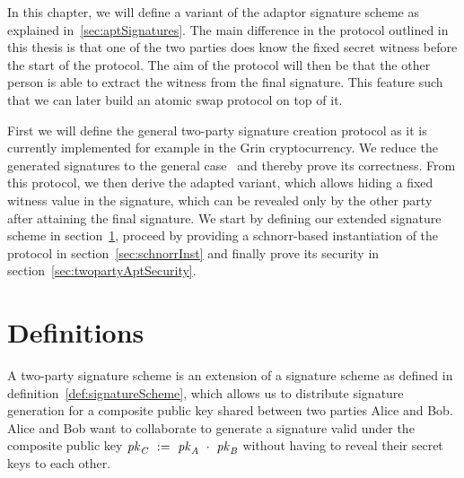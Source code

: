 In this chapter, we will define a variant of the adaptor signature scheme as explained in~\ref{sec:aptSignatures}. The main difference in the protocol outlined in this thesis is that one of the two parties does know the fixed secret witness before the start of the protocol. The aim of the protocol will then be that the other person is able to extract the witness from the final signature. This feature such that we can later build an atomic swap protocol on top of it.

First we will define the general two-party signature creation protocol as it is currently implemented for example in the Grin cryptocurrency.
We reduce the generated signatures to the general case~\cite{schnorr1989efficient} and thereby prove its correctness.
From this protocol, we then derive the adapted variant, which allows hiding a fixed witness
value in the signature, which can be revealed only by the other party after attaining the final signature.
We start by defining our extended signature scheme in section~\ref{sec:definitions}, proceed by providing a schnorr-based instantiation of the protocol in section~\ref{sec:schnorrInst} and finally prove its security in section~\ref{sec:twopartyAptSecurity}.


\section{Definitions}\label{sec:definitions}

A two-party signature scheme is an extension of a signature scheme as defined in definition~\ref{def:signatureScheme}, which allows us to distribute signature generation for a composite public key shared between two parties Alice and Bob.
Alice and Bob want to collaborate to generate a signature valid under the composite public key $\mathit{pk}_{\mathit{C}} ~:=~ \mathit{pk}_{\mathit{A}} ~\cdot~ \mathit{pk}_{\mathit{B}}$ without having to reveal their secret keys to each other.

